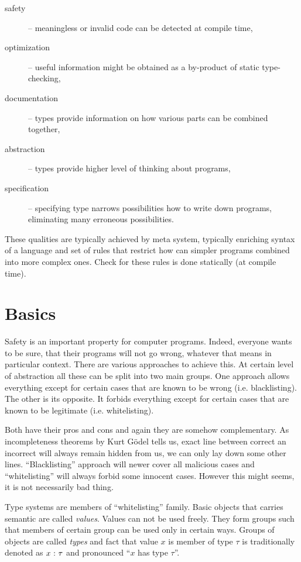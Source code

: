 \documentclass[11pt,oneside,draft]{fithesis2}
\newcommand\uv[1]{``#1''}
\theoremstyle{definition}
\begin{document}
\begin{description}
	\item[safety] -- meaningless or invalid code can be detected at compile time,
	\item[optimization] -- useful information might be obtained as a by-product of static type-checking,
	\item[documentation] -- types provide information on how various parts can be combined together,
	\item[abstraction] -- types provide higher level of thinking about programs,
	\item[specification] -- specifying type narrows possibilities how to write down programs,
		eliminating many erroneous possibilities.
\end{description}

These qualities are typically achieved by meta system, typically
enriching syntax of a language and set of rules that restrict how can
simpler programs combined into more complex ones.
Check for these rules is done statically (at compile time).

\section{Basics}

Safety is an important property for computer programs.
Indeed, everyone wants to be sure, that their programs will not go wrong,
whatever that means in particular context. There are various
approaches to achieve this. At certain level of abstraction
all these can be split into two main groups. One approach
allows everything except for certain cases that are known to be wrong
(i.e. blacklisting). The other is its opposite. It forbids
everything except for certain cases that are known to be legitimate
(i.e. whitelisting).

Both have their pros and cons and again they are somehow complementary.
As incompleteness theorems by Kurt G\"{o}del tells us, exact line
between correct an incorrect will always remain hidden from us,
we can only lay down some other lines. \uv{Blacklisting} approach
will newer cover all malicious cases and \uv{whitelisting} will
always forbid some innocent cases. However this might seems, it is
not necessarily bad thing.

Type systems are members of \uv{whitelisting} family. Basic objects
that carries semantic are called \emph{values}. Values can not be used
freely. They form groups such that members of certain group can be used
only in certain ways. Groups of objects are called \emph{types} and fact
that value \(x\) is member of type \(\tau\) is traditionally denoted as
\(x ~{:}~ \tau\) and pronounced \uv{\(x\) has type \(\tau\)}.
\end{document}
